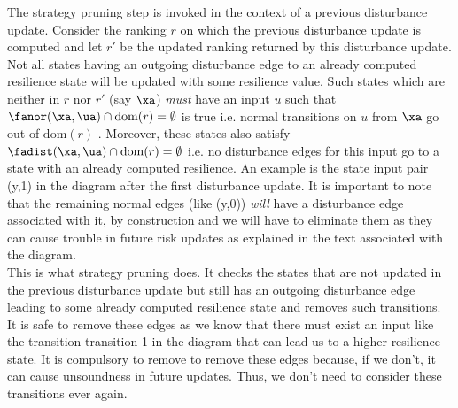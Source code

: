 	
The strategy pruning step is invoked in the context of a previous disturbance update. Consider the ranking $r$ on which the previous disturbance update is computed and let $r'$ be the updated ranking returned by this disturbance update. Not all states having an outgoing disturbance edge to an already computed resilience state will be updated with some resilience value. Such states which are neither in $r$ nor $r'$ (say $\xa$) \emph{must} have an input $u$ such that $\fanor(\xa, \ua) \cap \mathrm{dom}(r) = \emptyset$ is true i.e. normal transitions on $u$ from $\xa$ go out of $\mathrm{dom}(r)$ . Moreover, these states also satisfy $\fadist(\xa, \ua)\cap \mathrm{dom}(r) = \emptyset$ i.e. no disturbance edges for this input go to a state with an already computed resilience. An example is the state input pair (y,1) in the diagram after the first disturbance update. It is important to note that the remaining normal edges (like (y,0)) \emph{will} have a disturbance edge associated with it, by construction and we will have to eliminate them as they can cause trouble in future risk updates as explained in the text associated with the diagram.
\\
This is what strategy pruning does. It checks the states that are not updated in the previous disturbance update but still has an outgoing disturbance edge leading to some already computed resilience state and removes such transitions.\\

It is safe to remove these edges as we know that there must exist an input like the transition transition 1 in the diagram that can lead us to a higher resilience state. It is compulsory to remove to remove these edges because, if we don't, it can cause unsoundness in future updates.
Thus, we don't need to consider these transitions ever again. \\

